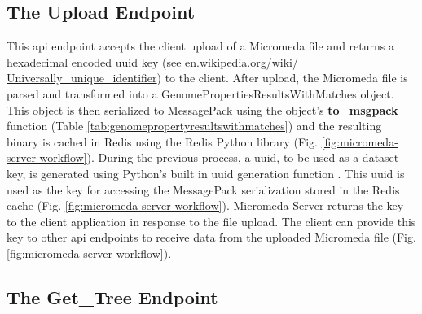 \subsection{The Upload Endpoint} \label{endpoint-upload}

This \gls{api} endpoint accepts the client upload of a Micromeda file and returns a hexadecimal encoded \gls{uuid} key \cite{leach2005universally} (see \href{http://en.wikipedia.org/wiki/Universally_unique_identifier}{en.wikipedia.org/wiki/ Universally\_unique\_identifier}) to the client. After upload, the Micromeda file is parsed and transformed into a GenomePropertiesResultsWithMatches object. This object is then serialized to MessagePack using the object's \textbf{to\_msgpack} function (Table \ref{tab:genomepropertyresultswithmatches}) and the resulting binary is cached in Redis using the Redis Python library \cite{mccurdy_2019} (Fig. \ref{fig:micromeda-server-workflow}). During the previous process, a \gls{uuid}, to be used as a dataset key, is generated using Python's built in \gls{uuid} generation function \cite{PythonUUID}. This \gls{uuid} is used as the key for accessing the MessagePack serialization stored in the Redis cache (Fig. \ref{fig:micromeda-server-workflow}). Micromeda-Server returns the key to the client application in response to the file upload. The client can provide this key to other \gls{api} endpoints to receive data from the uploaded Micromeda file (Fig. \ref{fig:micromeda-server-workflow}). 

\subsection{The Get\_Tree Endpoint} \label{get-tree}

